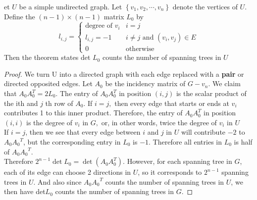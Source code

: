 \documentclass[12pt]{article}
\newenvironment{theorem}[2][Theorem]{\begin{trivlist}
\item[\hskip \labelsep {\bfseries #1}\hskip \labelsep {\bfseries #2.}]}{\end{trivlist}}
\begin{document}
\begin{theorem}
	Let $U$ be a simple undirected graph. Let $\left\{ v _ { 1 } , v _ { 2 } , \cdots , v _ { n } \right\}$ denote the vertices of $U$. Define the $( n - 1 ) \times ( n - 1 )$ matrix $L _ { 0 }$ by
	\[l_{i, j} = 
	\begin{cases} 
	\text{degree of } v _ { i } & i = j \\
	l _ { i , j } = - 1 & i \neq j \text{ and } (v_{ i },v _ { j }) \in E\\
	0 & \text{otherwise}
	\end{cases}\]
	Then the theorem states det $L_0$ counts the number of spanning trees in $U$
\end{theorem}

\begin{proof}
	We turn U into a directed graph with each edge replaced with a \textbf{pair} or directed opposited edges.
	\newline 
	Let $A _ { 0 }$ be the incidency matrix of $G - v_n$. We claim that $A _ { 0 } A _ { 0 } ^ { T } = 2 L _ { 0 } .$ The
	entry of $A _ { 0 } A _ { 0 } ^ { T }$ in position $( i , j )$ is the scalar product of the ith and $j$ th row of $A _ { 0 } .$ If $i = j ,$ then every edge that starts or ends at $v _ { i }$ contributes 1 to
	this inner product. Therefore, the entry of $A _ { 0 } A _ { 0 } ^ { T }$ in position $( i , i )$ is the
	degree of $v _ { i }$ in $G ,$ or, in other words, twice the degree of $v _ { i }$ in $U$\\
	\newline
	If $i = j$, then we see that every edge between $i$ and $j$ in $U$ will contribute $-2$ to $A_0{A_0}^T$, but the corresponding entry in $L_0$ is $-1$. Therefore all entries in $L_0$ is half of  $A_0{A_0}^T$. \\
	\newline
	Therefore $2 ^ { n - 1 } \operatorname { det } L _ { 0 } = \operatorname { det } \left( A _ { 0 } A _ { 0 } ^ { T } \right)$. However, for each spanning tree in $G$, each of its edge can choose 2 directions in $U$, so it corresponds to $2^{n-1}$ spanning trees in $U$. And also since $A_0{A_0}^T$ counts the number of spanning trees in $U$, we then have det$L_0$ counts the number of spanning trees in $G$.
\end{proof}
\end{document}
